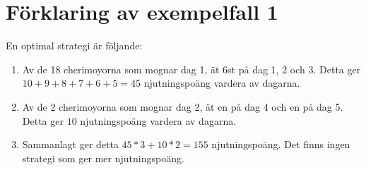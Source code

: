 \section*{Förklaring av exempelfall 1}
En optimal strategi är följande:
\begin{enumerate}
    \item Av de 18 cherimoyorna som mognar dag 1, ät 6st på dag 1, 2 och 3.
    Detta ger $10+9+8+7+6+5=45$ njutningspoäng vardera av dagarna.
    \item Av de 2 cherimoyorna som mognar dag 2, ät en på dag 4 och en på dag 5.
    Detta ger $10$ njutningspoäng vardera av dagarna.
    \item Sammanlagt ger detta $45*3+10*2=155$ njutningspoäng. Det finns ingen strategi
    som ger mer njutningspoäng.
\end{enumerate}
